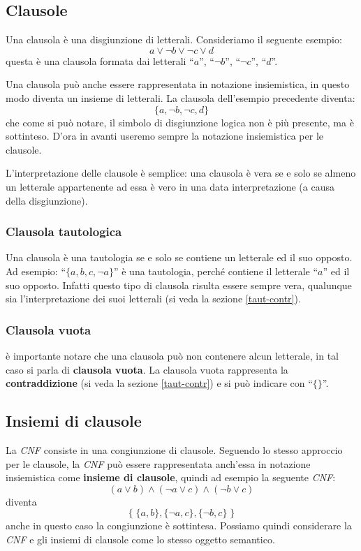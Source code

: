 \documentclass[a4paper,12pt]{report}
\begin{document}
\subsection{Clausole}
Una clausola è una disgiunzione di letterali. Consideriamo il seguente esempio:
\[ a \lor \lnot b \lor \lnot c \lor d \] 
questa è una clausola formata dai letterali ``$a$'', ``$\lnot b$'', ``$\lnot c$'', ``$d$''.

Una clausola può anche essere rappresentata in notazione insiemistica, in questo modo diventa un insieme di letterali. La clausola dell'esempio precedente diventa:
\[ \{a, \lnot b, \lnot c, d\}\]
che come si può notare, il simbolo di disgiunzione logica non è più presente, ma è sottinteso. D'ora in avanti useremo sempre la notazione insiemistica per le clausole.

L'interpretazione delle clausole è semplice: una clausola è vera se e solo se almeno un letterale appartenente ad essa è vero in una data interpretazione (a causa della disgiunzione).

\subsubsection{Clausola tautologica}
Una clausola è una tautologia se e solo se contiene un letterale ed il suo opposto. Ad esempio: ``$\{ a, b, c, \lnot a \}$'' è una tautologia, perché contiene il letterale ``$a$'' ed il suo opposto. Infatti questo tipo di clausola risulta essere sempre vera, qualunque sia l'interpretazione dei suoi letterali (si veda la sezione \ref{taut-contr}).

\subsubsection{Clausola vuota}
è importante notare che una clausola può non contenere alcun letterale, in tal caso si parla di \textbf{clausola vuota}. La clausola vuota rappresenta la \textbf{contraddizione} (si veda la sezione \ref{taut-contr}) e si può indicare con ``$\{ \}$''.

\subsection{Insiemi di clausole}
La \textit{CNF} consiste in una congiunzione di clausole. Seguendo lo stesso approccio per le clausole, la \textit{CNF} può essere rappresentata anch'essa in notazione insiemistica come \textbf{insieme di clausole}, quindi ad esempio la seguente \textit{CNF}:
\[ (a \lor b) \land (\lnot a \lor c) \land (\lnot b \lor c) \]
diventa
\[\{ \; \{a, b\}, \{\lnot a, c\}, \{\lnot b, c\} \; \}\]
anche in questo caso la congiunzione è sottintesa. Possiamo quindi considerare la \textit{CNF} e gli insiemi di clausole come lo stesso oggetto semantico.
\end{document}

